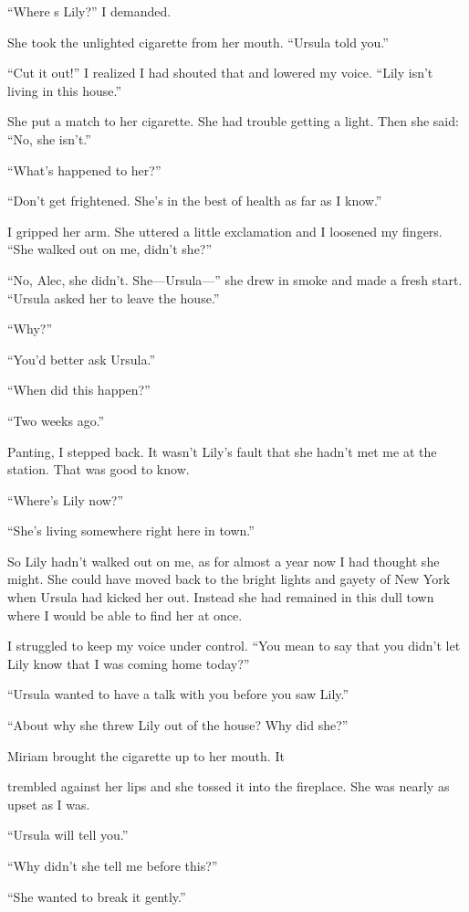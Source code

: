 \documentclass{novel}
\begin{document}
“Where s Lily?” I demanded.

She took the unlighted cigarette from her mouth. “Ursula told you.”

“Cut it out!” I realized I had shouted that and lowered my voice. “Lily isn’t living in this house.”

She put a match to her cigarette. She had trouble getting a light. Then she said: “No, she isn’t.”

“What’s happened to her?”

“Don’t get frightened. She’s in the best of health as far as I know.”

I gripped her arm. She uttered a little exclamation and I loosened my fingers. “She walked out on me, didn’t she?”

“No, Alec, she didn’t. She—Ursula—” she drew in smoke and made a fresh start. “Ursula asked her to leave the house.”

“Why?”

“You’d better ask Ursula.”

“When did this happen?”

“Two weeks ago.”

Panting, I stepped back. It wasn’t Lily’s fault that she hadn’t met me at the station. That was good to know.

“Where’s Lily now?”

“She’s living somewhere right here in town.”

So Lily hadn’t walked out on me, as for almost a year now I had thought she might. She could have moved back to the bright lights and gayety of New York when Ursula had kicked her out. Instead she had remained in this dull town where I would be able to find her at once.

I struggled to keep my voice under control. “You mean to say that you didn’t let Lily know that I was coming home today?”

“Ursula wanted to have a talk with you before you saw Lily.”

“About why she threw Lily out of the house? Why did she?”

Miriam brought the cigarette up to her mouth. It 

\noindent trembled against her lips and she tossed it into the fireplace. She was nearly as upset as I was. 

“Ursula will tell you.”

“Why didn’t she tell me before this?”

“She wanted to break it gently.”
\end{document}
